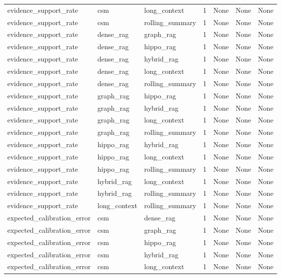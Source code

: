 \begin{tabular}{lllllll}
evidence\_support\_rate & csm & long\_context & 1 & None & None & None \\
evidence\_support\_rate & csm & rolling\_summary & 1 & None & None & None \\
evidence\_support\_rate & dense\_rag & graph\_rag & 1 & None & None & None \\
evidence\_support\_rate & dense\_rag & hippo\_rag & 1 & None & None & None \\
evidence\_support\_rate & dense\_rag & hybrid\_rag & 1 & None & None & None \\
evidence\_support\_rate & dense\_rag & long\_context & 1 & None & None & None \\
evidence\_support\_rate & dense\_rag & rolling\_summary & 1 & None & None & None \\
evidence\_support\_rate & graph\_rag & hippo\_rag & 1 & None & None & None \\
evidence\_support\_rate & graph\_rag & hybrid\_rag & 1 & None & None & None \\
evidence\_support\_rate & graph\_rag & long\_context & 1 & None & None & None \\
evidence\_support\_rate & graph\_rag & rolling\_summary & 1 & None & None & None \\
evidence\_support\_rate & hippo\_rag & hybrid\_rag & 1 & None & None & None \\
evidence\_support\_rate & hippo\_rag & long\_context & 1 & None & None & None \\
evidence\_support\_rate & hippo\_rag & rolling\_summary & 1 & None & None & None \\
evidence\_support\_rate & hybrid\_rag & long\_context & 1 & None & None & None \\
evidence\_support\_rate & hybrid\_rag & rolling\_summary & 1 & None & None & None \\
evidence\_support\_rate & long\_context & rolling\_summary & 1 & None & None & None \\
expected\_calibration\_error & csm & dense\_rag & 1 & None & None & None \\
expected\_calibration\_error & csm & graph\_rag & 1 & None & None & None \\
expected\_calibration\_error & csm & hippo\_rag & 1 & None & None & None \\
expected\_calibration\_error & csm & hybrid\_rag & 1 & None & None & None \\
expected\_calibration\_error & csm & long\_context & 1 & None & None & None \\

\end{tabular}
